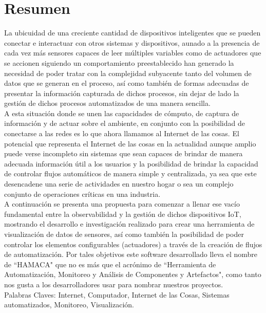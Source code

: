 \chapter*{Resumen}
La ubicuidad de una creciente cantidad de dispositivos inteligentes que se pueden conectar e interactuar con otros sistemas y dispositivos, aunado a la presencia de cada vez más sensores capaces de leer múltiples variables como de actuadores que se accionen siguiendo un comportamiento preestablecido han generado la necesidad de poder tratar con la complejidad subyacente tanto del volumen de datos que se generan en el proceso, así como también de formas adecuadas de presentar la información capturada de dichos procesos, sin dejar de lado la gestión de dichos procesos automatizados de una manera sencilla.\\

A esta situación donde se unen las capacidades de cómputo, de captura de información y de actuar sobre el ambiente, en conjunto con la posibilidad de conectarse a las redes es lo que ahora llamamos al Internet de las cosas. El potencial que representa el Internet de las cosas en la actualidad aunque amplio puede verse incompleto sin sistemas que sean capaces de brindar de manera adecuada información útil a los usuarios y la posibilidad de brindar la capacidad de controlar flujos automáticos de manera simple y centralizada, ya sea que este desencadene una serie de actividades en nuestro hogar o sea un complejo conjunto de operaciones críticas en una industria.\\ 

A continuación se presenta una propuesta para comenzar a llenar ese vacío fundamental entre la observabilidad y la gestión de dichos dispositivos IoT, mostrando el desarrollo e investigación realizado para crear una herramienta de visualización de datos de sensores, así como también la posibilidad de poder controlar los elementos configurables (actuadores) a través de la creación de flujos de automatización. Por tales objetivos este software desarrollado lleva el nombre de ``HAMACA" que no es más que el acrónimo de ``Herramienta de Automatización, Monitoreo y Análisis de Componentes y Artefactos", como tanto nos gusta a los desarrolladores usar para nombrar nuestros proyectos.\\
 
\vspace{\fill}
Palabras Claves: Internet, Computador, Internet de las Cosas, Sistemas automatizados, Monitoreo, Visualización.
\vspace{10px}
